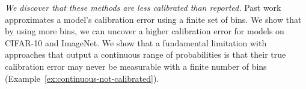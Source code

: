 


\emph{We discover that these methods are less calibrated than reported.} Past work approximates a model's calibration error using a finite set of bins. We show that by using more bins, we can uncover a higher calibration error for models on CIFAR-10 and ImageNet.
We show that a fundamental limitation with approaches that output a continuous range of probabilities is that their true calibration error may never be measurable with a finite number of bins (Example~\ref{ex:continuous-not-calibrated}).

